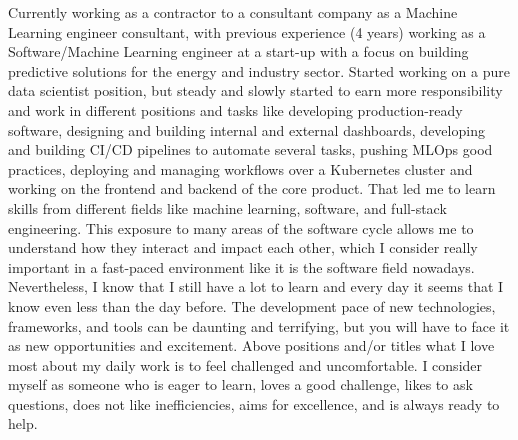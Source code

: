 

\begin{cvparagraph}
Currently working as a contractor to a consultant company as a Machine Learning engineer consultant, with previous experience (4 years) working as a Software/Machine Learning engineer at a start-up with a focus on building predictive solutions for the energy and industry sector. Started working on a pure data scientist position, but steady and slowly started to earn more responsibility and work in different positions and tasks like developing production-ready software, designing and building internal and external dashboards, developing and building CI/CD pipelines to automate several tasks, pushing MLOps good practices, deploying and managing workflows over a Kubernetes cluster and working on the frontend and backend of the core product. That led me to learn skills from different fields like machine learning, software, and full-stack engineering. This exposure to many areas of the software cycle allows me to understand how they interact and impact each other, which I consider really important in a fast-paced environment like it is the software field nowadays. Nevertheless, I know that I still have a lot to learn and every day it seems that I know even less than the day before. The development pace of new technologies, frameworks, and tools can be daunting and terrifying, but you will have to face it as new opportunities and excitement. Above positions and/or titles what I love most about my daily work is to feel challenged and uncomfortable. I consider myself as someone who is eager to learn, loves a good challenge, likes to ask questions, does not like inefficiencies, aims for excellence, and is always ready to help. 
\end{cvparagraph}
